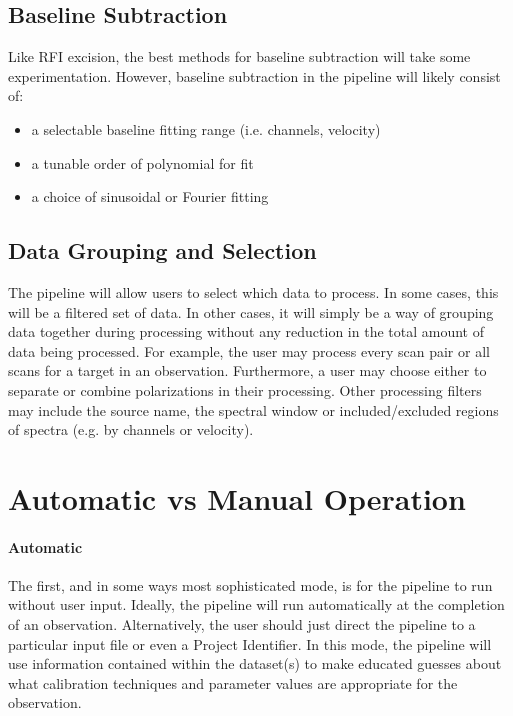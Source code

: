 \subsection{Baseline Subtraction}

Like RFI excision, the best methods for baseline subtraction will take some experimentation.  However, baseline subtraction in the pipeline will likely consist of:

\begin{itemize}
\item a selectable baseline fitting range (i.e. channels, velocity)
\item a tunable order of polynomial for fit
\item a choice of sinusoidal or Fourier fitting
\end{itemize}

\subsection{Data Grouping and Selection}

The pipeline will allow users to select which data to process.  In some cases, this will be a filtered set of data.  In other cases, it will simply be a way of grouping data together during processing without any reduction in the total amount of data being processed.  For example, the user may process every scan pair or all scans for a target in an observation.  Furthermore, a user may choose either to separate or combine polarizations in their processing.  Other processing filters may include the source name, the spectral window or included/excluded regions of spectra (e.g. by channels or velocity).

\section{Automatic vs Manual Operation}

\paragraph{Automatic}

The first, and in some ways most sophisticated mode, is for the pipeline to run without user input.  Ideally, the pipeline will run automatically at the completion of an observation.  Alternatively, the user should just direct the pipeline to a particular input file or even a Project Identifier.  In this mode, the pipeline will use information contained within the dataset(s) to make educated guesses about what calibration techniques and parameter values are appropriate for the observation.

